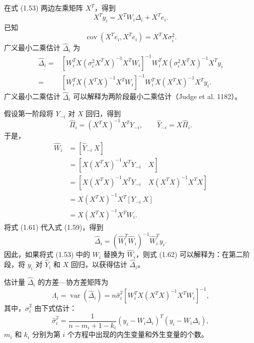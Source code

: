 在式 (1.53) 两边左乘矩阵 $X^{T}$，得到
\begin{equation}
 X^{T}y_i=X^{T}W_i\Delta_i+X^{T}e_i.
 \tag{1.58}
\end{equation}
已知
\[
 \operatorname{cov}(X^{T}e_i,X^{T}e_i)=X^{T}X\sigma_i^2.
\]
广义最小二乘估计 $\widehat\Delta_i$ 为
\begin{equation}
 \begin{aligned}
 \widehat\Delta_i
  ={}&\left[W_i^{T}X(\sigma_i^2 X^{T}X)^{-1}X^{T}W_i\right]^{-1}
       W_i^{T}X(\sigma_i^2 X^{T}X)^{-1}X^{T}y_i\\
  ={}&\left[W_i^{T}X(X^{T}X)^{-1}X^{T}W_i\right]^{-1}
       W_i^{T}X(X^{T}X)^{-1}X^{T}y_i.
 \end{aligned}
 \tag{1.59}
\end{equation}
广义最小二乘估计 $\widehat\Delta_i$ 可以解释为两阶段最小二乘估计（Judge et al. 1182）。

假设第一阶段将 $Y_{-i}$ 对 $X$ 回归，得到
\begin{equation}
 \widehat\Pi_i=(X^{T}X)^{-1}X^{T}Y_{-i},
 \qquad
 \widehat Y_{-i}=X\widehat\Pi_i.
 \tag{1.60}
\end{equation}
于是，
\begin{equation}
 \begin{aligned}
 \widehat W_i
 &=\left[\widehat Y_{-i}\ X\right]\\
 &=\left[X(X^{T}X)^{-1}X^{T}Y_{-i}\quad X\right]\\
 &=\left[X(X^{T}X)^{-1}X^{T}Y_{-i}\quad X(X^{T}X)^{-1}X^{T}X\right]\\
 &=X(X^{T}X)^{-1}X^{T}[Y_{-i}\ X]\\
 &=X(X^{T}X)^{-1}X^{T}W_i.
 \end{aligned}
 \tag{1.61}
\end{equation}
将式 (1.61) 代入式 (1.59)，得到
\begin{equation}
 \widehat\Delta_i
 =\left(\widehat W_i^{T}\widehat W_i\right)^{-1}
   \widehat W_i^{T}y_i.
 \tag{1.62}
\end{equation}
因此，如果将式 (1.53) 中的 $W_i$ 替换为 $\widehat W_i$，则式 (1.62) 可以解释为：在第二阶段，将 $y_i$ 对 $\widehat Y_i$ 和 $X$ 回归，以获得估计 $\widehat\Delta_i$。

估计量 $\widehat\Delta_i$ 的方差—协方差矩阵为
\begin{equation}
 \Lambda_i=\operatorname{var}(\widehat\Delta_i)
  =n\widehat\sigma_i^2
    \left[W_i^{T}X(X^{T}X)^{-1}X^{T}W_i\right]^{-1},
 \tag{1.63}
\end{equation}
其中，$\widehat\sigma_i^2$ 由下式估计：
\begin{equation}
 \widehat\sigma_i^2=
 \frac{1}{n-m_i+1-k_i}
 (y_i-W_i\Delta_i)^{T}(y_i-W_i\Delta_i),
 \tag{1.64}
\end{equation}
$m_i$ 和 $k_i$ 分别为第 $i$ 个方程中出现的内生变量和外生变量的个数。

